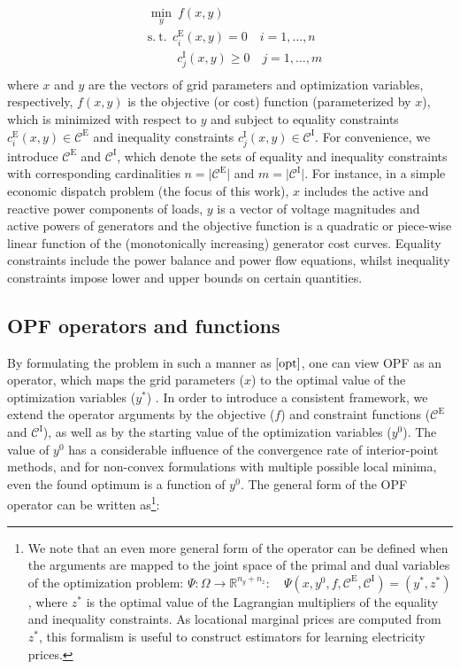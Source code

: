 \documentclass[journal]{IEEEtran}
\begin{document}
\begin{equation}
    \begin{aligned}
        & \min \limits_{y}\ f(x, y) \\
        & \mathrm{s.\ t.} \ \ c_{i}^{\mathrm{E}}(x, y) = 0 \quad i = 1, \dots, n \\
        & \quad \; \; \; \; \; c_{j}^{\mathrm{I}}(x, y) \ge 0 \quad j = 1, \dots, m \\
    \end{aligned}
    \label{opt}
\end{equation}
where $x$ and $y$ are the vectors of grid parameters and optimization variables, respectively, $f(x, y)$ is the objective (or cost) function (parameterized by $x$), which is minimized with respect to $y$ and subject to equality constraints $c_{i}^{\mathrm{E}}(x, y) \in \mathcal{C}^{\mathrm{E}}$ and inequality constraints $c_{j}^{\mathrm{I}}(x, y) \in \mathcal{C}^{\mathrm{I}}$. For convenience, we introduce $\mathcal{C}^{\mathrm{E}}$ and $\mathcal{C}^{\mathrm{I}}$, which denote the sets of equality and inequality constraints with corresponding cardinalities $n = \lvert \mathcal{C}^{\mathrm{E}} \rvert$ and $m = \lvert \mathcal{C}^{\mathrm{I}} \rvert$. For instance, in a simple economic dispatch problem (the focus of this work), $x$ includes the active and reactive power components of loads, $y$ is a vector of voltage magnitudes and active powers of generators and the objective function is a quadratic or piece-wise linear function of the (monotonically increasing) generator cost curves. Equality constraints include the power balance and power flow equations, whilst inequality constraints impose lower and upper bounds on certain quantities.

\subsection{OPF operators and functions}
By formulating the problem in such a manner as $\eqref{opt}$, one can view OPF as an operator, which maps the grid parameters ($x$) to the optimal value of the optimization variables ($y^{*}$) \cite{Zhou2020}. In order to introduce a consistent framework, we extend the operator arguments by the objective ($f$) and constraint functions ($\mathcal{C}^{\mathrm{E}}$ and $\mathcal{C}^{\mathrm{I}}$), as well as by the starting value of the optimization variables ($y^{0}$). The value of $y^{0}$ has a considerable influence of the convergence rate of interior-point methods, and for non-convex formulations with multiple possible local minima, even the found optimum is a function of $y^{0}$. The general form of the OPF operator can be written as\footnote{We note that an even more general form of the operator can be defined when the arguments are mapped to the joint space of the primal and dual variables of the optimization problem: $\Psi: \Omega \to \mathbb{R}^{n_{y} + n_{z}}: \quad \Psi \left( x, y^{0}, f, \mathcal{C}^{\mathrm{E}}, \mathcal{C}^{\mathrm{I}} \right) = (y^{*}, z^{*})$, where $z^{*}$ is the optimal value of the Lagrangian multipliers of the equality and inequality constraints. As locational marginal prices are computed from $z^{*}$, this formalism is useful to construct estimators for learning electricity prices.}:
\end{document}
